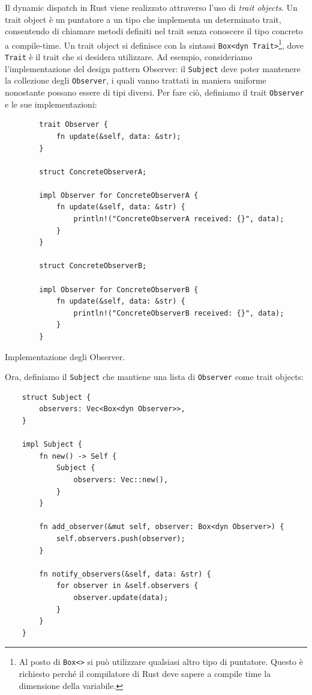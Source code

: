 Il dynamic dispatch in Rust viene realizzato attraverso l'uso di \textit{trait objects}. Un trait object è un puntatore a un tipo che implementa un determinato trait, consentendo di chiamare metodi definiti nel trait senza conoscere il tipo concreto a compile-time. Un trait object si definisce con la sintassi \texttt{Box<dyn Trait>}\footnote{Al posto di \texttt{Box<>} si può utilizzare qualsiasi altro tipo di puntatore. Questo è richiesto perché il compilatore di Rust deve sapere a compile time la dimensione della variabile.}, dove \texttt{Trait} è il trait che si desidera utilizzare. Ad esempio, consideriamo l'implementazione del design pattern Observer: il \texttt{Subject} deve poter mantenere la collezione degli \texttt{Observer}, i quali vanno trattati in maniera uniforme nonostante possano essere di tipi diversi. Per fare ciò, definiamo il trait \texttt{Observer} e le sue implementazioni:
\begin{listing}[H]
    \begin{verbatim}
        trait Observer {
            fn update(&self, data: &str);
        }

        struct ConcreteObserverA;

        impl Observer for ConcreteObserverA {
            fn update(&self, data: &str) {
                println!("ConcreteObserverA received: {}", data);
            }
        }

        struct ConcreteObserverB;

        impl Observer for ConcreteObserverB {
            fn update(&self, data: &str) {
                println!("ConcreteObserverB received: {}", data);
            }
        }
    \end{verbatim}
    \caption{Implementazione degli Observer.}
    \label{lst:observer}
\end{listing}
Ora, definiamo il \texttt{Subject} che mantiene una lista di \texttt{Observer} come trait objects:
\begin{verbatim}
    struct Subject {
        observers: Vec<Box<dyn Observer>>,
    }

    impl Subject {
        fn new() -> Self {
            Subject {
                observers: Vec::new(),
            }
        }

        fn add_observer(&mut self, observer: Box<dyn Observer>) {
            self.observers.push(observer);
        }

        fn notify_observers(&self, data: &str) {
            for observer in &self.observers {
                observer.update(data);
            }
        }
    }
\end{verbatim}
